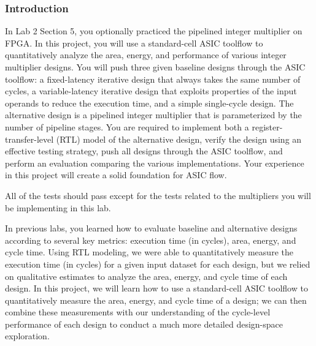 \documentclass[a4paper,12pt,twoside]{article}
\begin{document}
\subsubsection{Introduction}
In Lab 2 Section 5, you optionally practiced the pipelined integer multiplier on FPGA. In this project, you will use a standard-cell ASIC toolflow to quantitatively analyze the area, energy, and performance of various integer multiplier designs. You will push three given baseline designs through the ASIC toolflow: a fixed-latency iterative design that always takes the same number of cycles, a variable-latency iterative design that exploits properties of the input operands to reduce the execution time, and a simple single-cycle design. The alternative design is a pipelined integer multiplier that is parameterized by the number of pipeline stages. You are required to implement both a register-transfer-level (RTL) model of the alternative design, verify the design using an effective testing strategy, push all designs through the ASIC toolflow, and perform an evaluation comparing the various implementations. Your experience in this project will create a solid foundation for ASIC flow.

All of the tests should pass except for the tests related to the multipliers you will be implementing in this lab.

In previous labs, you learned how to evaluate baseline and alternative designs according to several key metrics: execution time (in cycles), area, energy, and cycle time. Using RTL modeling, we were able to quantitatively measure the execution time (in cycles) for a given input dataset for each design, but we relied on qualitative estimates to analyze the area, energy, and cycle time of each design. In this project, we will learn how to use a standard-cell ASIC toolflow to quantitatively measure the area, energy, and cycle time of a design; we can then combine these measurements with our understanding of the cycle-level performance of each design to conduct a much more detailed design-space exploration.
\end{document}
